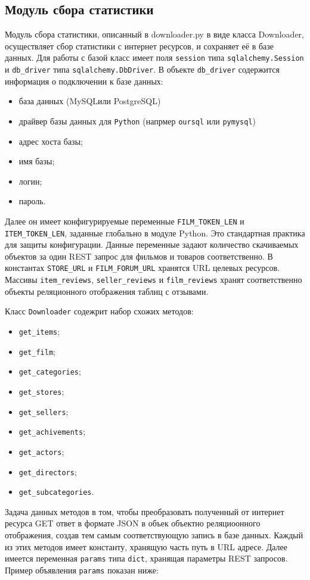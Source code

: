 \subsection{Модуль сбора статистики}
Модуль сбора статистики, описанный в downloader.py в виде класса Downloader, осуществляет сбор статистики с интернет ресурсов, и сохраняет её в базе данных. Для работы с базой класс имеет поля \texttt{session} типа \texttt{sqlalchemy.Session} и \texttt{db\_driver} типа \texttt{sqlalchemy.DbDriver}. В объекте \texttt{db\_driver} содержится информация о подключении к базе данных:
\begin{itemize}
\item база данных (MySQL\@ или PostgreSQL\@)
\item драйвер базы данных для \texttt{Python} (напрмер \texttt{oursql} или \texttt{pymysql})
\item адрес хоста базы;
\item имя базы;
\item логин;
\item пароль.
\end{itemize}
Далее он имеет конфигурируемые переменные \texttt{FILM\_TOKEN\_LEN} и \texttt{ITEM\_TOKEN\_LEN}, заданные глобально в модуле Python. Это стандартная практика для защиты конфигурации. Данные переменные задают количество скачиваемых объектов за один REST запрос для фильмов и товаров соответственно. В константах \texttt{STORE\_URL} и \texttt{FILM\_FORUM\_URL} хранятся URL целевых ресурсов. Массивы \texttt{item\_reviews}, \texttt{seller\_reviews} и \texttt{film\_reviews} хранят соответственно объекты реляционного отображения таблиц с отзывами.

Класс \texttt{Downloader} содежрит набор схожих методов:
\begin{itemize}
\item \texttt{get\_items};
\item \texttt{get\_film};
\item \texttt{get\_categories};
\item \texttt{get\_stores};
\item \texttt{get\_sellers};
\item \texttt{get\_achivements};
\item \texttt{get\_actors};
\item \texttt{get\_directors};
\item \texttt{get\_subcategories}.
\end{itemize}

Задача данных методов в том, чтобы преобразовать полученный от интернет ресурса GET ответ в формате JSON в объек объектно реляциоонного отображения, создав тем самым соответствующую запись в базе данных. Каждый из этих методов имеет константу, хранящую часть путь в URL адресе. Далее имеется переменная {\texttt{params}} типа \texttt{dict}, хранящая параметры REST запросов. Пример объявления \texttt{params} показан ниже:

